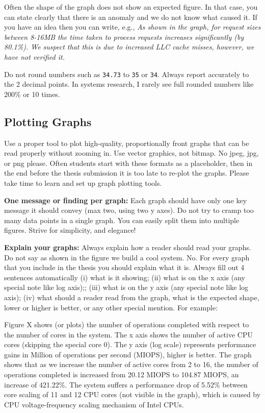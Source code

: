 \documentclass[11pt]{article}
\begin{document}
Often the shape of the graph does not show an expected figure. In that case, you can state clearly that there is an anomaly and we do not know what caused it. If you have an idea then you can write, e.g., \textit{As shown in the graph, for request sizes between 8-16MB the time taken to process requests increases significantly (by 80.1\%). We suspect that this is due to increased LLC cache misses, however, we have not verified it.}


Do not round numbers such as \texttt{34.73} to \texttt{35} or \texttt{34}. Always report accurately to the 2 decimal points. In systems research, I rarely see full rounded numbers like 200\% or 10 times. 

\subsection*{Plotting Graphs} 
Use a proper tool to plot high-quality, proportionally front graphs that can be read properly without zooming in. Use vector graphics, not bitmap. No jpeg, jpg, or png please. Often students start with these formats as a placeholder, then in the end before the thesis submission it is too late to re-plot the graphs. Please take time to learn and set up graph plotting tools. 


\textbf{One message or finding per graph:} Each graph should have only one key message it should convey (max two, using two y axes). Do not try to cramp too many data points in a single graph. You can easily split them into multiple figures. Strive for simplicity, and elegance! 


\textbf{Explain your graphs:} Always explain how a reader should read your graphs. Do not say as shown in the figure we build a cool system. No. For every graph that you include in the thesis you should explain what it is. Always fill out 4 sentences automatically (i) what is it showing; (ii) what is on the x axis (any special note like log axis);; (iii) what is on the y axis (any special note like log axis); (iv) what should a reader read from the graph, what is the expected shape, lower or higher is better, or any other special mention. For example: 
\begin{tcolorbox}[colback=green!5,colframe=gray!40!black,title=Example of a graph explanation in a figure]
Figure X shows (or plots) the number of operations completed with respect to the number of cores in the system. The x axis shows the number of active CPU cores (skipping the special core 0). The y axis (log scale) represents performance gains in Million of operations per second (MIOPS), higher is better. The graph shows that as we increase the number of active cores from 2 to 16, the number of operations completed is increased from 20.12 MIOPS to 104.87 MIOPS, an increase of 421.22\%. The system suffers a performance drop of 5.52\% between core scaling of 11 and 12 CPU cores (not visible in the graph), which is caused by CPU voltage-frequency scaling mechanism of Intel CPUs. 
\end{tcolorbox}
\end{document}

